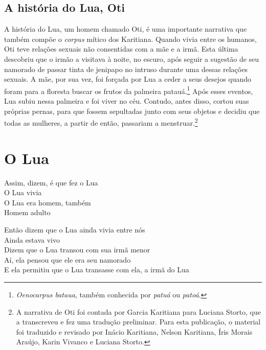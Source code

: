 \section{A história do Lua, Oti} A história do Lua, um homem chamado Oti, é uma importante narrativa que também compõe o \textit{corpus} mítico dos Karitiana. Quando vivia entre
os humanos, Oti teve relações sexuais não consentidas com a mãe e a
irmã. Esta última descobriu que o irmão a visitava à noite, no escuro,
após seguir a sugestão de seu namorado de passar tinta de jenipapo no
intruso durante uma dessas relações sexuais. A mãe, por sua vez, foi
forçada por Lua a ceder a seus desejos quando foram para a floresta
buscar os frutos da palmeira patauá.\footnote{\textit{Oenocarpus bataua}, também 
conhecida por \textit{patuá} ou \textit{patoá}.} Após esses eventos, Lua subiu
nessa palmeira e foi viver no céu. Contudo, antes disso, cortou suas
próprias pernas, para que fossem sepultadas junto com seus objetos e
decidiu que todas as mulheres, a partir de então, passariam a menstruar.\footnote{A narrativa de Oti foi contada por Garcia Karitiana para Luciana Storto,
que a transcreveu e fez uma tradução preliminar. Para esta publicação, o
material foi traduzido e revisado por Inácio Karitiana, Nelson
Karitiana, Íris Morais Araújo, Karin Vivanco e Luciana Storto.}
\vspace*{\fill}


\chapter{O Lua}

\begin{linenumbers}\begingroup\raggedright
\noindent Assim, dizem, é que fez o Lua\\
O Lua vivia\\
O Lua era homem, também\\
Homem adulto
\end{linenumbers}\endgroup

\bigskip

\begin{linenumbers}\begingroup\raggedright
\noindent Então dizem que o Lua ainda vivia entre nós\\
Ainda estava vivo\\
Dizem que o Lua transou com sua irmã menor\\
Aí, ela pensou que ele era seu namorado\\
E ela permitiu que o Lua transasse com ela, a irmã do Lua
\end{linenumbers}\endgroup

